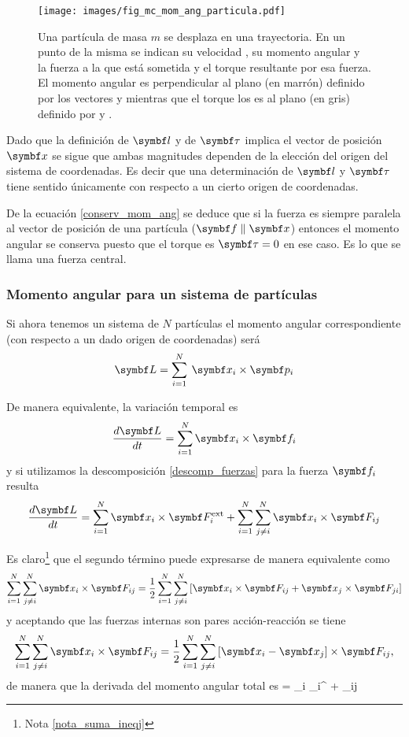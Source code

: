 \documentclass[10pt,oneside]{CBFT_book}
\begin{document}
\begin{figure}[hbt]
	\begin{center}
	\texttt{[image: images/fig\_mc\_mom\_ang\_particula.pdf]}	
	\end{center}
	\caption{Una partícula de masa $m$ se desplaza en una trayectoria. En un punto  de la misma se
	indican su velocidad , su momento angular  y la fuerza  a la que está sometida y el
	torque resultante \vb{\tau} por esa fuerza.
	El momento angular es perpendicular al plano (en marrón) definido por los vectores  y  mientras que 
	el torque los es al plano (en gris) definido por  y .}
	\label{fig_mc_mom_ang_particula}
\end{figure} 

Dado que la definición de $ \vb{l} $ y de $ \vb{\tau} $ implica el vector de posición $ \vb{x} $ se sigue que ambas 
magnitudes dependen de la elección del origen del sistema de coordenadas. 
Es decir que una determinación de $ \vb{l} $ y $ \vb{\tau} $ tiene sentido únicamente con respecto a un cierto origen 
de coordenadas.

De la ecuación \eqref{conserv_mom_ang} se deduce que si la fuerza es siempre paralela al vector de posición de una 
partícula ($\vb{f} \parallel \vb{x}$) entonces el momento angular  se conserva puesto que el torque es 
$\vb{\tau}=0$ en ese caso. Es lo que se llama una fuerza central.

\subsubsection{Momento angular para un sistema de partículas}

Si ahora tenemos un sistema de $N$ partículas el momento angular correspondiente (con respecto a un dado origen de
coordenadas) será
\[
	\vb{L} = \Sum{i=1}{N} \: \vb{x}_i \times \vb{p}_i
\]

De manera equivalente, la variación temporal es 
\[
	\dtot{\vb{L}}{t} = \Sum{i=1}{N} \vb{x}_i \times \vb{f}_i
\]
y si utilizamos la descomposición \eqref{descomp_fuerzas} para la fuerza $\vb{f}_i$ resulta
\[
	\dtot{\vb{L}}{t} = \Sum{i=1}{N} \vb{x}_i \times \vb{F}_i^\text{ext}  +
	\Sum{i=1}{N} \Sum{j\neq i}{N}  \vb{x}_i \times \vb{F}_{ij}
\]

Es claro\footnote{Nota \ref{nota_suma_ineqj}} que el segundo término puede expresarse de manera equivalente como 
\[
	\Sum{i=1}{N} \Sum{j\neq i}{N}  \vb{x}_i \times \vb{F}_{ij} =
	\frac{1}{2} 
	\Sum{i=1}{N} \Sum{j \neq i}{N}  \left[ \vb{x}_i \times \vb{F}_{ij} + \vb{x}_j \times \vb{F}_{ji} \right]
\]
y aceptando que las fuerzas internas son pares acción-reacción se tiene 
\[
	\Sum{i=1}{N} \Sum{j\neq i}{N}  \vb{x}_i \times \vb{F}_{ij} =
	\frac{1}{2} 
	\Sum{i=1}{N} \Sum{j \neq i}{N}  \left[ \vb{x}_i - \vb{x}_j \right] \times \vb{F}_{ij},
\]
de manera que la derivada del momento angular total es 
\be
	 =  _i \times {}_i^  +
	    \left[ \vb{x}_i - \vb{x}_j \right] \times {}_{ij} 
	\label{dL_sistema}
\ee
\end{document}
